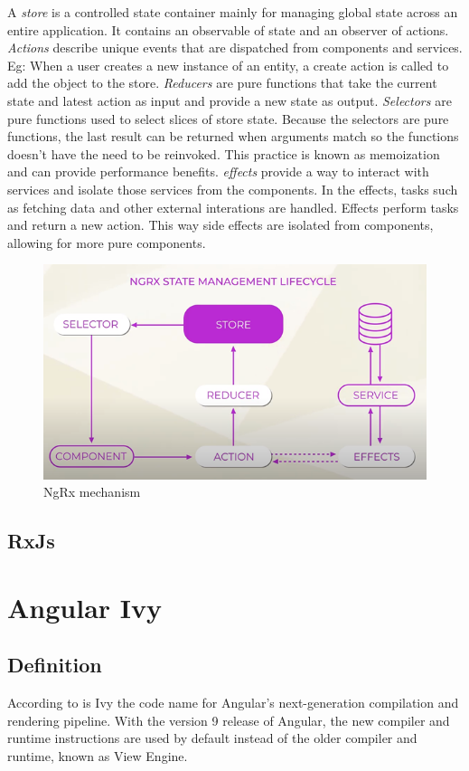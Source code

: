 A \emph{store} is a controlled state container mainly for managing global state across an entire application. It contains an observable of state and an observer of actions. \emph{Actions} describe unique events that are dispatched from components and services. Eg: When a user creates a new instance of an entity, a create action is called to add the object to the store. \emph{Reducers} are pure functions that take the current state and latest action as input and provide a new state as output. \emph{Selectors} are pure functions used to select slices of store state. Because the selectors are pure functions, the last result can be returned when arguments match so the functions doesn't have the need to be reinvoked. This practice is known as memoization and can provide performance benefits. \emph{effects} provide a way to interact with services and isolate those services from the components. In the effects, tasks such as fetching data and other external interations are handled. Effects perform tasks and return a new action. This way side effects are isolated from components, allowing for more pure components.

\autocite{AltexSoft}
\begin{figure}[h!]
	\caption{NgRx mechanism}
	\centering
	\includegraphics[width=\textwidth]{img/ngrx.png} 
\end{figure}

\subsection{RxJs}

\section{Angular Ivy}
\subsection{Definition}
According to \textcite{Angular.io-ivy} is Ivy the code name for Angular's next-generation compilation and rendering pipeline. With the version 9 release of Angular, the new compiler and runtime instructions are used by default instead of the older compiler and runtime, known as View Engine.

